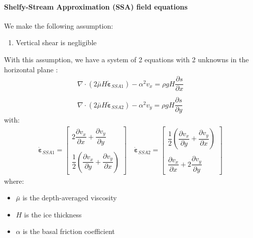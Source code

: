 \paragraph{Shelfy-Stream Approximation (SSA) field equations}
We make the following assumption:
\begin{enumerate}
	\item Vertical shear is negligible
\end{enumerate}
With this assumption, we have a system of 2 equations with 2 unknowns in the horizontal plane
\citep{Morland1987a, MacAyeal1989}:
\begin{equation}
	\begin{array}{l}
		\nabla\cdot\left(2\bar{\mu}H\dot{\boldsymbol{\varepsilon}}_{SSA1}\right) - \alpha^2 v_x= \rho g H \dfrac{\partial s}{\partial x} \\
		\\
		\nabla\cdot\left(2\bar{\mu}H\dot{\boldsymbol{\varepsilon}}_{SSA2}\right) - \alpha^2 v_y= \rho g H \dfrac{\partial s}{\partial y}
	\end{array}
\end{equation}
with:
\begin{equation}
	\begin{array}{l}
		\dot{\boldsymbol{\varepsilon}}_{SSA1} = \left[
		\begin{array}{c}
			2\dfrac{\partial v_x}{\partial x} +  \dfrac{\partial v_y}{\partial y}\\
			\\
			\dfrac{1}{2}\left(\dfrac{\partial v_x}{\partial y} + \dfrac{\partial v_y}{\partial x}\right)
		\end{array}
		\right]
		\quad
		\dot{\boldsymbol{\varepsilon}}_{SSA2} =\left[
		\begin{array}{c}
			\dfrac{1}{2}\left(\dfrac{\partial v_x}{\partial y} + \dfrac{\partial v_y}{\partial x}\right)\\
			\\
			\dfrac{\partial v_x}{\partial x} + 2\dfrac{\partial v_y}{\partial y}
		\end{array}
		\right]
	\end{array}
\end{equation}
where:
\begin{itemize}
	\item $\bar{\mu}$ is the depth-averaged viscosity
	\item $H$ is the ice thickness
	\item $\alpha$ is the basal friction coefficient
\end{itemize}

